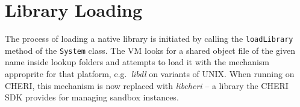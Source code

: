 \documentclass[a4paper,12pt,twoside,openright]{report}
\newcommand{\class}[1]{\texttt{#1}}
\newcommand{\tool}[1]{\emph{#1}}
\newcommand{\lib}[1]{\tool{lib#1}}
\begin{document}
\section{Library Loading}

The process of loading a native library is initiated by calling the \texttt{loadLibrary} method of the \class{System} class. The VM looks for a shared object file of the given name inside lookup folders and attempts to load it with the mechanism approprite for that platform, e.g.\ \lib{dl} on variants of UNIX. When running on CHERI, this mechanism is now replaced with \lib{cheri} -- a library the CHERI SDK provides for managing sandbox instances. 

\end{document}
